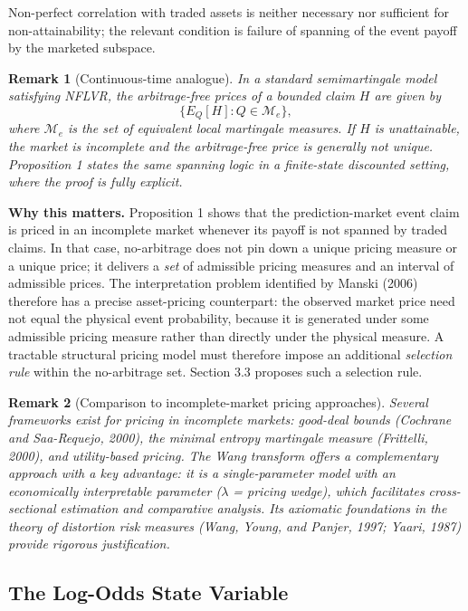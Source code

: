 \documentclass[12pt,a4paper]{article}
\newtheorem{remark}{Remark}
\begin{document}
Non-perfect correlation with traded assets is neither necessary nor sufficient for non-attainability; the relevant condition is failure of spanning of the event payoff by the marketed subspace.

\begin{remark}[Continuous-time analogue]
In a standard semimartingale model satisfying NFLVR, the arbitrage-free prices of a bounded claim $H$ are given by
\[
\{E_Q[H]:Q\in\mathcal{M}_e\},
\]
where $\mathcal{M}_e$ is the set of equivalent local martingale measures. If $H$ is unattainable, the market is incomplete and the arbitrage-free price is generally not unique. Proposition 1 states the same spanning logic in a finite-state discounted setting, where the proof is fully explicit.
\end{remark}

\textbf{Why this matters.} Proposition 1 shows that the prediction-market event claim is priced in an incomplete market whenever its payoff is not spanned by traded claims. In that case, no-arbitrage does not pin down a unique pricing measure or a unique price; it delivers a \emph{set} of admissible pricing measures and an interval of admissible prices. The interpretation problem identified by Manski (2006) therefore has a precise asset-pricing counterpart: the observed market price need not equal the physical event probability, because it is generated under some admissible pricing measure rather than directly under the physical measure. A tractable structural pricing model must therefore impose an additional \emph{selection rule} within the no-arbitrage set. Section 3.3 proposes such a selection rule.

\begin{remark}[Comparison to incomplete-market pricing approaches]
Several frameworks exist for pricing in incomplete markets: good-deal bounds (Cochrane and Saa-Requejo, 2000), the minimal entropy martingale measure (Frittelli, 2000), and utility-based pricing. The Wang transform offers a complementary approach with a key advantage: it is a single-parameter model with an economically interpretable parameter ($\lambda$ = pricing wedge), which facilitates cross-sectional estimation and comparative analysis. Its axiomatic foundations in the theory of distortion risk measures (Wang, Young, and Panjer, 1997; Yaari, 1987) provide rigorous justification.
\end{remark}

\subsection{The Log-Odds State
Variable}\label{the-log-odds-state-variable}
\end{document}
